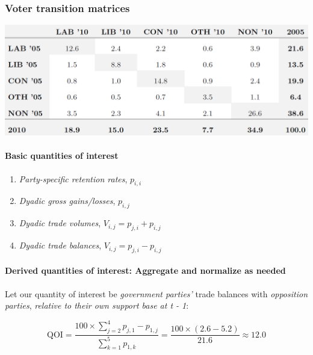 \documentclass[
  11pt,
]{article}
\providecommand{\tightlist}{%
  \setlength{\itemsep}{0pt}\setlength{\parskip}{0pt}}
\begin{document}
\hypertarget{voter-transition-matrices}{%
\subsubsection{Voter transition matrices}\label{voter-transition-matrices}}

\begin{center}\includegraphics[width=0.9\linewidth]{images/transition-matrix} \end{center}

\hypertarget{basic-quantities-of-interest}{%
\paragraph{Basic quantities of interest}\label{basic-quantities-of-interest}}

\begin{enumerate}
\def\labelenumi{\arabic{enumi}.}
\tightlist
\item
  \emph{Party-specific retention rates}, \(p_{i,i}\)
\item
  \emph{Dyadic gross gains/losses}, \(p_{i,j}\)
\item
  \emph{Dyadic trade volumes}, \(V_{i,j} = p_{j,i} + p_{i,j}\)
\item
  \emph{Dyadic trade balances}, \(V_{i,j} = p_{j,i} - p_{i,j}\)
\end{enumerate}

\hypertarget{derived-quantities-of-interest-aggregate-and-normalize-as-needed}{%
\paragraph{Derived quantities of interest: Aggregate and normalize as needed}\label{derived-quantities-of-interest-aggregate-and-normalize-as-needed}}

Let our quantity of interest be \emph{government parties'} trade balances with \emph{opposition parties}, \emph{relative to their own support base at t - 1}:

\[\text{QOI} = \frac{100 \times \sum_{j = 2}^{4} p_{j, 1} -  p_{1, j}}{\sum_{k = 1}^{5} p_{1, k}} = \frac{100 \times (2.6 - 5.2)}{21.6} \approx 12.0\]
\end{document}
